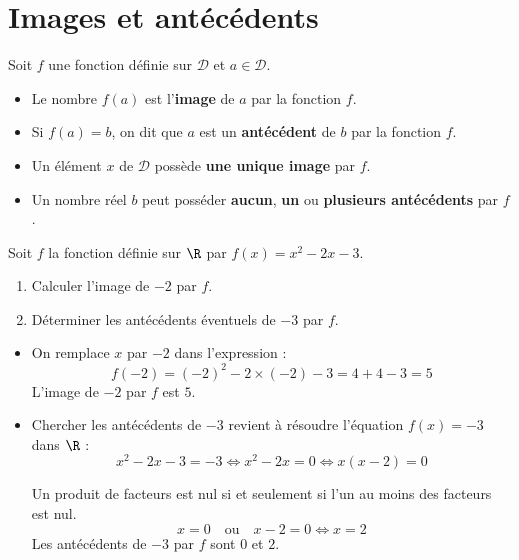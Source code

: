 \section{Images et antécédents}

\begin{defin}
	Soit $f$ une fonction définie sur $\mathcal{D}$ et $a \in \mathcal{D}$.
	\begin{itemize}
		\item Le nombre $f(a)$ est l'\textbf{image} de $a$ par la fonction $f$.
		\item Si $f(a) = b$, on dit que $a$ est un \textbf{antécédent} de $b$ par la fonction $f$.
	\end{itemize}
\end{defin}

\begin{rem}
	\nline
	\begin{itemize}
		\item Un élément $x$ de $\mathcal{D}$ possède \textbf{une unique image} par $f$.
		\item Un nombre réel $b$ peut posséder \textbf{aucun}, \textbf{un} ou \textbf{plusieurs antécédents} par $f$.
	\end{itemize}
\end{rem}

\begin{methode}
	Soit $f$ la fonction définie sur $\R$ par $f(x) = x^2 - 2x - 3$.
	\begin{enumerate}
		\item Calculer l'image de $-2$ par $f$.
		\item Déterminer les antécédents éventuels de $-3$ par $f$.
	\end{enumerate}

	\begin{correction}
		\nline
		\begin{itemize}
			\item On remplace $x$ par $-2$ dans l'expression :
			      \[
				      f(-2) = (-2)^2 - 2 \times (-2) - 3 = 4 + 4 - 3 = 5
			      \]
			      L'image de $-2$ par $f$ est $5$.

			\item Chercher les antécédents de $-3$ revient à résoudre l'équation $f(x) = -3$ dans $\R$ :
			      \[
				      x^2 - 2x - 3 = -3 \iff x^2 - 2x = 0 \iff x(x - 2) = 0
			      \]

			      Un produit de facteurs est nul si et seulement si l'un au moins des facteurs est nul.
			      \[
				      x = 0 \quad \text{ou} \quad x - 2 = 0 \iff x = 2
			      \]
			      Les antécédents de $-3$ par $f$ sont $0$ et $2$.
		\end{itemize}
	\end{correction}
\end{methode}

